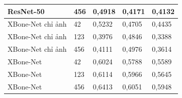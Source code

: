 \begin{longtable}{|L{2.70cm}|C{1.05cm}|*{3}{C{1.50cm}|}}
ResNet-50 & 456 & 0{,}4918 & 0{,}4171 & 0{,}4132 \\ \hline
XBone-Net chỉ ảnh & 42 & 0{,}5232 & 0{,}4705 & 0{,}4435 \\ \hline
XBone-Net chỉ ảnh & 123 & 0{,}3976 & 0{,}4846 & 0{,}3388 \\ \hline
XBone-Net chỉ ảnh & 456 & 0{,}4111 & 0{,}4976 & 0{,}3614 \\ \hline
{}XBone-Net & 42 & 0{,}6024 & 0{,}5788 & 0{,}5589 \\ \hline
{}XBone-Net & 123 & 0{,}6114 & 0{,}5966 & 0{,}5645 \\ \hline
{}XBone-Net & 456 & 0{,}6413 & 0{,}6051 & 0{,}5948 \\ \hline
\end{longtable}
\endgroup
